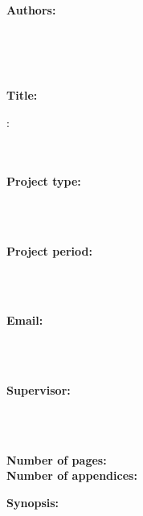 \begin{minipage}[t]{0.48\textwidth}
	\textbf{Authors:} \\[5pt]\bigskip\hspace{2ex}
		\begin{minipage}{0.8\linewidth}
			\groupmemberI\\
			\groupmemberII\
		\end{minipage}\\[5pt]
	\textbf{Title:} \\[5pt]\bigskip\hspace{2ex}
		\begin{minipage}{.8\linewidth}
			\projectnameextexnsion:\\
			\projectname\
		\end{minipage}\\	[5pt]
	\textbf{Project type:} \\[5pt]\bigskip\hspace{2ex}
		\begin{minipage}{.8\linewidth}
			\semestername\
		\end{minipage}\\[5pt]
	\textbf{Project period:} \\[5pt]\bigskip\hspace{2ex}
		\begin{minipage}{.8\linewidth}
			\projectperiod\
		\end{minipage}\\[5pt]
	\textbf{Email:} \\[5pt]\bigskip\hspace{2ex}
		\begin{minipage}{.8\linewidth}
			\groupemail\
		\end{minipage}\\[5pt]
	\textbf{Supervisor:} \\[5pt]\bigskip\hspace{2ex}
		\begin{minipage}{.8\linewidth}
			\supervisor\
		\end{minipage}\\[5pt]
	\textbf{Number of pages:} \numberofpages \\
	\textbf{Number of appendices:} \numberofappendix \\
\end{minipage}
\begin{minipage}[t]{0.483\textwidth}
\textbf{Synopsis:} \\[5pt]
\fbox{\parbox{7cm}{\smallskip\smallskip}}
\end{minipage}
\vfill
\cleardoublepage
